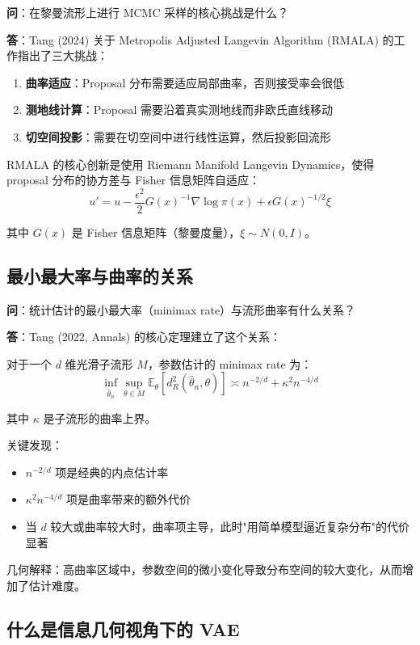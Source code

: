 \textbf{问}：在黎曼流形上进行 MCMC 采样的核心挑战是什么？

\textbf{答}：Tang (2024) 关于 Metropolis Adjusted Langevin Algorithm (RMALA) 的工作指出了三大挑战：

\begin{enumerate}
    \item \textbf{曲率适应}：Proposal 分布需要适应局部曲率，否则接受率会很低
    \item \textbf{测地线计算}：Proposal 需要沿着真实测地线而非欧氏直线移动
    \item \textbf{切空间投影}：需要在切空间中进行线性运算，然后投影回流形
\end{enumerate}

RMALA 的核心创新是使用 Riemann Manifold Langevin Dynamics，使得 proposal 分布的协方差与 Fisher 信息矩阵自适应：
$$u' = u - \frac{\epsilon^2}{2} G(x)^{-1} \nabla \log \pi(x) + \epsilon G(x)^{-1/2} \xi$$

其中 $G(x)$ 是 Fisher 信息矩阵（黎曼度量），$\xi \sim N(0, I)$。

\subsection{最小最大率与曲率的关系}\label{sec:qa-minimax-curvature}

\textbf{问}：统计估计的最小最大率（minimax rate）与流形曲率有什么关系？

\textbf{答}：Tang (2022, Annals) 的核心定理建立了这个关系：

对于一个 $d$ 维光滑子流形 $M$，参数估计的 minimax rate 为：
$$\inf_{\hat{\theta}_n} \sup_{\theta \in M} \mathbb{E}_\theta [d_R^2(\hat{\theta}_n, \theta)] \asymp n^{-2/d} + \kappa^2 n^{-4/d}$$

其中 $\kappa$ 是子流形的曲率上界。

关键发现：
\begin{itemize}
    \item $n^{-2/d}$ 项是经典的内点估计率
    \item $\kappa^2 n^{-4/d}$ 项是曲率带来的额外代价
    \item 当 $d$ 较大或曲率较大时，曲率项主导，此时"用简单模型逼近复杂分布"的代价显著
\end{itemize}

几何解释：高曲率区域中，参数空间的微小变化导致分布空间的较大变化，从而增加了估计难度。

\subsection{什么是信息几何视角下的 VAE}\label{sec:qa-info-geometry-vae}

